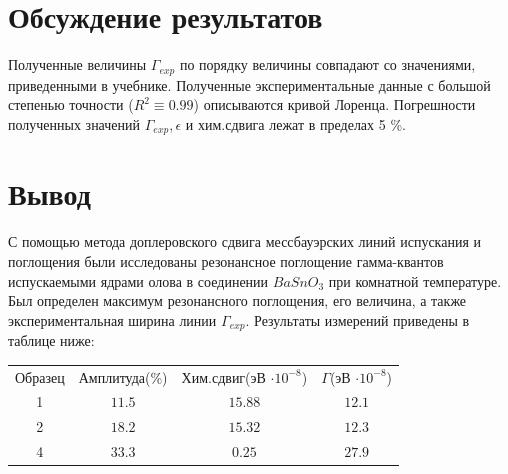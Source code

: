 \documentclass[12pt,a4paper]{article}
\begin{document}
\section{Обсуждение результатов}
Полученные величины $\Gamma_{exp}$ по порядку величины совпадают со значениями, приведенными в учебнике. Полученные экспериментальные данные с большой степенью точности ($R^2 \equiv 0.99$) описываются кривой Лоренца. Погрешности полученных значений $\Gamma_{exp}, \epsilon$ и хим.сдвига лежат в пределах 5 \%.

\section{Вывод}
С помощью метода доплеровского сдвига мессбауэрских линий испускания и поглощения были исследованы резонансное поглощение гамма-квантов испускаемыми ядрами олова в соединении $BaSnO_3$ при комнатной температуре. Был определен максимум резонансного поглощения, его величина, а также экспериментальная ширина линии $\Gamma_{exp}$.
Результаты измерений приведены в таблице ниже:
\begin{center}
\begin{tabular}{cccc}
Образец & Амплитуда(\%) & Хим.сдвиг(эВ $\cdot 10^{-8}$) & $\Gamma$(эВ $\cdot 10^{-8}$) \\
1 & $11.5$ & $ 15.88 $ & $ 12.1 $  \\
2 & $18.2$ & $ 15.32 $ & $ 12.3$ \\
4 & $33.3$ & $ 0.25 $   & $ 27.9 $ \\
\end{tabular}
\end{center}

\end{document}
